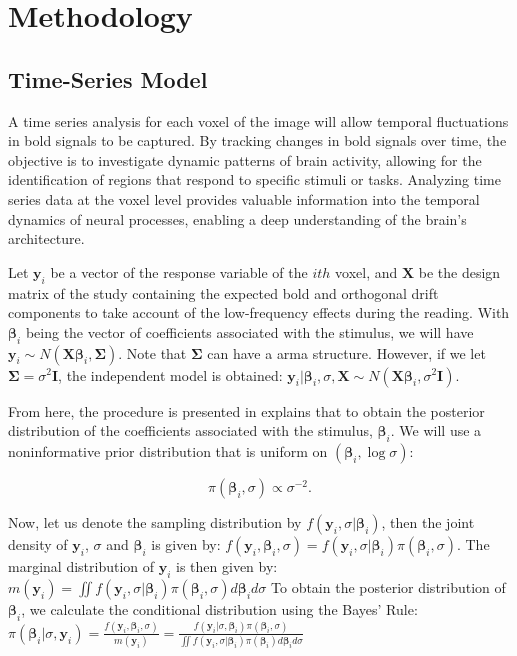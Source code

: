\chapter{Methodology}

\section{Time-Series Model}

A time series analysis for each voxel of the image will allow temporal fluctuations in \gls{bold} signals to be captured. By tracking changes in \gls{bold} signals over time, the objective is to investigate dynamic patterns of brain activity, allowing for the identification of regions that respond to specific stimuli or tasks. Analyzing time series data at the voxel level provides valuable information into the temporal dynamics of neural processes, enabling a deep understanding of the brain's architecture.

Let $\bm{y}_i$ be a vector of the response variable of the $ith$ voxel, and $\bm{X}$ be the design matrix of the study containing the expected \gls{bold} and orthogonal drift components to take account of the low-frequency effects during the reading. With $\bm{\beta}_i$ being the vector of coefficients associated with the stimulus, we will have $\bm{y}_i \sim N ( \bm{X} \bm{\beta}_i, \bm{\Sigma})$. Note that $\bm{\Sigma}$ can have a \gls{arma} structure. However, if we let $\bm{\Sigma}=\sigma^2 \bm{I}$, the independent model is obtained: 
$
\bm{y}_i|\bm{\beta}_i, \sigma, \bm{X} \sim N \left(\bm{X} \bm{\beta}_i,\sigma^2 \bm{I}\right).
$

From here, the procedure is presented in \cite{gelman2013bayesian} explains that to obtain the posterior distribution of the coefficients associated with the stimulus, $\bm{\beta}_i$. We will use a noninformative prior distribution that is uniform on $(\bm{\beta}_i,\log \sigma)$:

\begin{equation}
\pi \left( \bm{\beta}_i, \sigma \right) \propto \sigma^{-2}.
\end{equation}

Now, let us denote the sampling distribution by $f(\bm{y}_i,\sigma|\bm{\beta}_i)$, then the joint density of $\bm{y}_i$, $\sigma$ and $\bm{\beta}_i$ is given by:
$
f(\bm{y}_i,\bm{\beta}_i,\sigma) = f(\bm{y}_i,\sigma|\bm{\beta}_i) \pi (\bm{\beta}_i, \sigma).
$
The marginal distribution of $\bm{y}_i$ is then given by:
$
m(\bm{y}_i) = \iint f(\bm{y}_i,\sigma|\bm{\beta}_i) \pi (\bm{\beta}_i, \sigma) d\bm{\beta}_i d\sigma
$
To obtain the posterior distribution of $\bm{\beta}_i$, we calculate the conditional distribution using the Bayes' Rule:
$
\pi \left( \bm{\beta}_i| \sigma, \bm{y}_i \right) = \frac{f(\bm{y}_i,\bm{\beta}_i,\sigma)}{m(\bm{y}_i)} = \frac{ f(\bm{y}_i|\sigma, \bm{\beta}_i) \pi (\bm{\beta}_i,\sigma)}{\iint f(\bm{y}_i,\sigma|\bm{\beta}_i) \pi (\bm{\beta}_i) d\bm{\beta}_i d\sigma}
$ 

